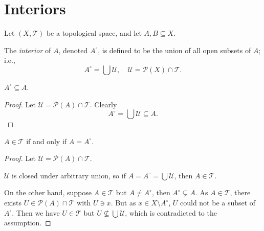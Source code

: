 \section{Interiors}


Let $(X, \mathcal T)$ be a topological space, and let $A, B \subseteq X$.


\begin{definition}
	The \textit{interior} of $A$, denoted $A^\circ$, is defined to be the union of all open subsets of $A$; i.e.,
	$$
	A^\circ = \bigcup \mathcal U, \quad \mathcal U = \mathcal P(X) \cap \mathcal T.
	$$
\end{definition}


\begin{proposition}
	$A^\circ \subseteq A$.
	
	\begin{proof}
		Let $\mathcal U = \mathcal P(A) \cap \mathcal T$. Clearly
		$$
		A^\circ = \bigcup \mathcal U \subseteq A.
		$$
	\end{proof}
\end{proposition}


\begin{proposition}
	$A \in \mathcal T$ if and only if $A = A^\circ$.
	
	\begin{proof}
		Let $\mathcal U = \mathcal P(A) \cap \mathcal T$.
		
		$\mathcal U$ is closed under arbitrary union, so if $A = A^\circ = \bigcup \mathcal U$, then $A \in \mathcal T$.
		
		On the other hand, suppose $A \in \mathcal T$ but $A \ne A^\circ$, then $A^\circ \subsetneq A$. As $A \in \mathcal T$, there exists $U \in \mathcal P(A) \cap \mathcal T$ with $U \ni x$. But as $x \in X \setminus A^\circ$, $U$ could not be a subset of $A^\circ$. Then we have $U \in \mathcal T$ but $U \not \subseteq \bigcup \mathcal U$, which is contradicted to the assumption.
	\end{proof}
\end{proposition}


